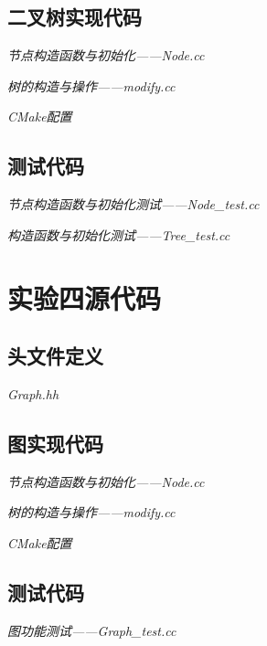 \documentclass[format=draft,language=chinese,category=academic-report]{hustreport}
\begin{document}
\subsection{二叉树实现代码}
\emph{节点构造函数与初始化——Node.cc}

\emph{树的构造与操作——modify.cc}

\emph{CMake配置}

\subsection{测试代码}\label{appendix:test3}
\emph{节点构造函数与初始化测试——Node\_test.cc}

\emph{构造函数与初始化测试——Tree\_test.cc}


\section{实验四源代码}\label{appendix:lab4}
\subsection{头文件定义}\label{appendix:h4}
\emph{Graph.hh}

\subsection{图实现代码}
\emph{节点构造函数与初始化——Node.cc}

\emph{树的构造与操作——modify.cc}

\emph{CMake配置}

\subsection{测试代码}\label{appendix:test4}
\emph{图功能测试——Graph\_test.cc}

\end{document}
